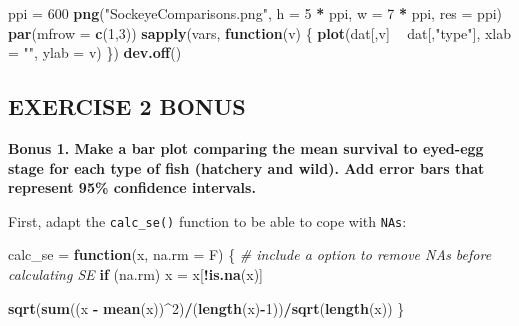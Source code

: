 \documentclass[]{book}
\newenvironment{Shaded}{\begin{snugshade}}{\end{snugshade}}
\newcommand{\KeywordTok}[1]{\textcolor[rgb]{0.13,0.29,0.53}{\textbf{#1}}}
\newcommand{\DataTypeTok}[1]{\textcolor[rgb]{0.13,0.29,0.53}{#1}}
\newcommand{\DecValTok}[1]{\textcolor[rgb]{0.00,0.00,0.81}{#1}}
\newcommand{\StringTok}[1]{\textcolor[rgb]{0.31,0.60,0.02}{#1}}
\newcommand{\CommentTok}[1]{\textcolor[rgb]{0.56,0.35,0.01}{\textit{#1}}}
\newcommand{\ControlFlowTok}[1]{\textcolor[rgb]{0.13,0.29,0.53}{\textbf{#1}}}
\newcommand{\OperatorTok}[1]{\textcolor[rgb]{0.81,0.36,0.00}{\textbf{#1}}}
\newcommand{\NormalTok}[1]{#1}
\theoremstyle{definition}
\theoremstyle{definition}
\theoremstyle{definition}
\theoremstyle{remark}
\begin{document}
\begin{Shaded}
\begin{Highlighting}[]
\NormalTok{ppi =}\StringTok{ }\DecValTok{600}
\KeywordTok{png}\NormalTok{(}\StringTok{"SockeyeComparisons.png"}\NormalTok{, }\DataTypeTok{h =} \DecValTok{5} \OperatorTok{*}\StringTok{ }\NormalTok{ppi, }\DataTypeTok{w =} \DecValTok{7} \OperatorTok{*}\StringTok{ }\NormalTok{ppi, }\DataTypeTok{res =}\NormalTok{ ppi)}
\KeywordTok{par}\NormalTok{(}\DataTypeTok{mfrow =} \KeywordTok{c}\NormalTok{(}\DecValTok{1}\NormalTok{,}\DecValTok{3}\NormalTok{))}
\KeywordTok{sapply}\NormalTok{(vars, }\ControlFlowTok{function}\NormalTok{(v) \{}
  \KeywordTok{plot}\NormalTok{(dat[,v] }\OperatorTok{~}\StringTok{ }\NormalTok{dat[,}\StringTok{"type"}\NormalTok{], }\DataTypeTok{xlab =} \StringTok{""}\NormalTok{, }\DataTypeTok{ylab =}\NormalTok{ v)}
\NormalTok{\})}
\KeywordTok{dev.off}\NormalTok{()}
\end{Highlighting}
\end{Shaded}

\subsection*{EXERCISE 2 BONUS}\label{exercise-2-bonus-1}

\textbf{Bonus 1. Make a bar plot comparing the mean survival to eyed-egg
stage for each type of fish (hatchery and wild). Add error bars that
represent 95\% confidence intervals.}

First, adapt the \texttt{calc\_se()} function to be able to cope with
\texttt{NAs}:

\begin{Shaded}
\begin{Highlighting}[]
\NormalTok{calc_se =}\StringTok{ }\ControlFlowTok{function}\NormalTok{(x, }\DataTypeTok{na.rm =}\NormalTok{ F) \{}
  \CommentTok{# include a option to remove NAs before calculating SE}
  \ControlFlowTok{if}\NormalTok{ (na.rm) x =}\StringTok{ }\NormalTok{x[}\OperatorTok{!}\KeywordTok{is.na}\NormalTok{(x)]}
  
  \KeywordTok{sqrt}\NormalTok{(}\KeywordTok{sum}\NormalTok{((x }\OperatorTok{-}\StringTok{ }\KeywordTok{mean}\NormalTok{(x))}\OperatorTok{^}\DecValTok{2}\NormalTok{)}\OperatorTok{/}\NormalTok{(}\KeywordTok{length}\NormalTok{(x)}\OperatorTok{-}\DecValTok{1}\NormalTok{))}\OperatorTok{/}\KeywordTok{sqrt}\NormalTok{(}\KeywordTok{length}\NormalTok{(x))}
\NormalTok{\}}
\end{Highlighting}
\end{Shaded}
\end{document}
